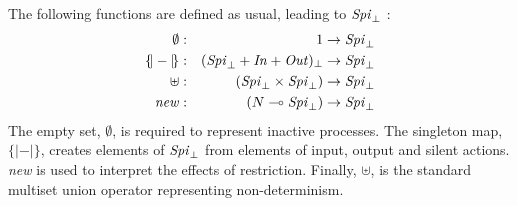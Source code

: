 \documentclass{entcs} \usepackage{entcsmacro}
\begin{document}
The following functions are defined as usual, leading to $\mbox{{\itshape Spi\/}}_\bot$ \cite[Def. 3.3]{abramsky1}:
\begin{eqnarray}
\emptyset&:&1\to\mbox{{\itshape Spi\/}}_\bot\\
\{\!|-|\!\}&:&(\mbox{{\itshape Spi\/}}_\bot+\mbox{{\itshape In\/}}+\mbox{{\itshape Out\/}})_\bot\to\mbox{{\itshape Spi\/}}_\bot\\
\uplus&:&(\mbox{{\itshape Spi\/}}_\bot\times\mbox{{\itshape  Spi\/}}_\bot)\to\mbox{{\itshape Spi\/}}_\bot\\
\mbox{{\itshape new\/}}&:&(N\multimap\mbox{{\itshape Spi\/}}_\bot)\to\mbox{{\itshape Spi\/}}_\bot
\end{eqnarray}
The empty set, $\emptyset$, is required to represent inactive processes. The singleton map, $\{\!|-|\!\}$, creates elements of $\mbox{{\itshape Spi\/}}_\bot$ from elements of input, output and silent actions.  {\itshape new\/} is used to interpret the effects of restriction.  Finally, $\uplus$, is the standard multiset union operator representing non-determinism.
\end{document}
